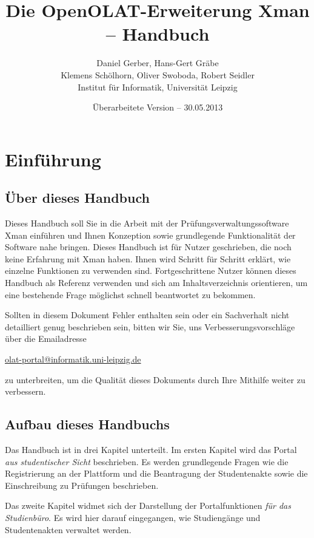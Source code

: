 \documentclass[a4paper,11pt]{article}
\author{Daniel Gerber, Hans-Gert Gräbe\\ 
Klemens Schölhorn, Oliver Swoboda, Robert Seidler\\
Institut für Informatik, Universität Leipzig}
\title{Die OpenOLAT-Erweiterung Xman -- Handbuch}
\date{Überarbeitete Version -- 30.05.2013}
\begin{document}
\maketitle

\vspace{3em}

\tableofcontents

\clearpage
\section*{Einführung}

\subsection*{Über dieses Handbuch}

Dieses Handbuch soll Sie in die Arbeit mit der Prüfungsverwaltungssoftware
Xman einführen und Ihnen Konzeption sowie grundlegende Funktionalität der
Software nahe bringen. Dieses Handbuch ist für Nutzer geschrieben, die noch
keine Erfahrung mit Xman haben. Ihnen wird Schritt für Schritt erklärt, wie
einzelne Funktionen zu verwenden sind.  Fortgeschrittene Nutzer können dieses
Handbuch als Referenz verwenden und sich am Inhaltsverzeichnis orientieren, um
eine bestehende Frage möglichst schnell beantwortet zu bekommen.

Sollten in diesem Dokument Fehler enthalten sein oder ein Sachverhalt nicht
detailliert genug beschrieben sein, bitten wir Sie, uns
Verbesserungsvorschläge über die Emailadresse
\begin{center}
  \url{olat-portal@informatik.uni-leipzig.de} 
\end{center}
zu unterbreiten, um die Qualität dieses Dokuments durch Ihre Mithilfe weiter
zu verbessern.

\subsection*{Aufbau dieses Handbuchs}

Das Handbuch ist in drei Kapitel unterteilt. Im ersten Kapitel wird das Portal
{\em aus studentischer Sicht} beschrieben. Es werden
grundlegende Fragen wie die Registrierung an der Plattform und die Beantragung der
Studentenakte sowie die Einschreibung zu Prüfungen beschrieben.

Das zweite Kapitel widmet sich der Darstellung der Portalfunktionen {\em für
das Studienbüro}. Es wird hier darauf eingegangen,
wie Studiengänge und Studentenakten verwaltet werden.
\end{document}
